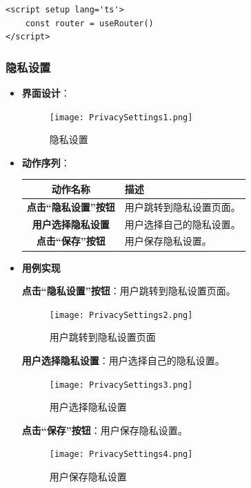 \begin{itemize}
	\begin{verbatim}
<script setup lang='ts'>
	const router = useRouter()
</script>
	\end{verbatim}

\end{itemize}

\subsubsection{隐私设置}

\begin{itemize}
\item \textbf{界面设计}：
	\begin{figure}[H]
		\centering
		\texttt{[image: PrivacySettings1.png]}
		\caption{隐私设置}
	\end{figure}
	\item \textbf{动作序列}：
	\begin{table}[H]
		\centering
		\renewcommand\arraystretch{1.5}
		\begin{tabular}{|c|>{\raggedright\arraybackslash}p{10cm}|}
			\hline
			\textbf{动作名称} & \textbf{描述} \\ \hline
			\textbf{点击“隐私设置”按钮} & 用户跳转到隐私设置页面。\\ \hline
			\textbf{用户选择隐私设置} & 用户选择自己的隐私设置。\\ \hline
			\textbf{点击“保存”按钮} & 用户保存隐私设置。\\ \hline
		\end{tabular}
	\end{table}

	\item \textbf{用例实现}

	\textbf{点击“隐私设置”按钮}：用户跳转到隐私设置页面。

	\begin{figure}[H]
		\centering
		\texttt{[image: PrivacySettings2.png]}
		\caption{用户跳转到隐私设置页面}
	\end{figure}

	\textbf{用户选择隐私设置}：用户选择自己的隐私设置。

	\begin{figure}[H]
		\centering
		\texttt{[image: PrivacySettings3.png]}
		\caption{用户选择隐私设置}
	\end{figure}

	\textbf{点击“保存”按钮}：用户保存隐私设置。

	\begin{figure}[H]
		\centering
		\texttt{[image: PrivacySettings4.png]}
		\caption{用户保存隐私设置}
	\end{figure}


\end{itemize}
